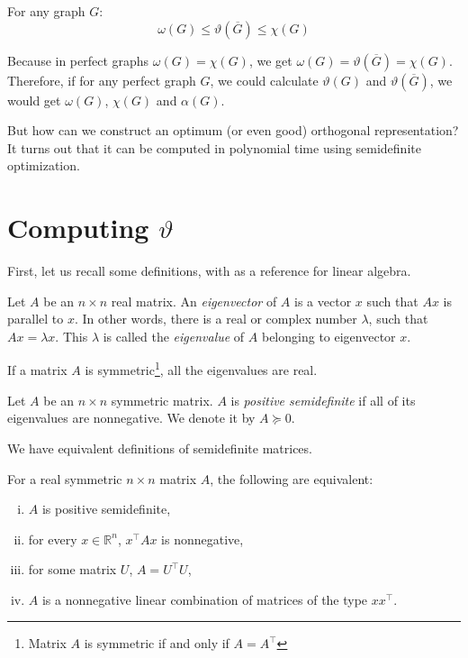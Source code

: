 \begin{theorem}
  \label{thm:sandwich}
  For any graph $G$:
  $$ \omega(G) \leq \vartheta(\overline{G}) \leq \chi(G) $$
\end{theorem}

Because in perfect graphs $\omega(G) = \chi(G)$, we get $\omega(G) = \vartheta(\overline{G}) = \chi(G)$. Therefore, if for any perfect graph $G$, we could calculate $\vartheta(G)$ and $\vartheta(\overline{G})$, we would get $\omega(G)$, $\chi(G)$ and $\alpha(G)$.

But how can we construct an optimum (or even good) orthogonal representation? It turns out that it can be computed in polynomial time using semidefinite optimization.

\section{Computing \boldmath$\vartheta$}
\label{sec:computingTheta}

First, let us recall some definitions, with \cite{gilbertstrang2020} as a reference for linear algebra.

\begin{defn}
  Let $A$ be an $n \times n$ real matrix. An \emph{eigenvector} of $A$ is a vector $x$ such that $Ax$ is parallel to $x$. In other words, there is a real or complex number $\lambda$, such that $Ax = \lambda x$. This $\lambda$ is called the \emph{eigenvalue} of $A$ belonging to eigenvector $x$.
\end{defn}

If a matrix $A$ is symmetric\footnote{Matrix $A$ is symmetric if and only if $A = A^\intercal$}, all the eigenvalues are real.

\begin{defn}
  Let $A$ be an $n \times n$ symmetric matrix. $A$ is \emph{positive semidefinite} if all of its eigenvalues are nonnegative. We denote it by $A \succeq 0$.
\end{defn}

We have equivalent definitions of semidefinite matrices.
\begin{theorem}
  For a real symmetric $n \times n$ matrix $A$, the following are equivalent:
  \begin{enumerate}[(i)]
    \item $A$ is positive semidefinite,
    \item \label{en:ei2} for every $x \in \mathbb{R}^n$, $x^\intercal Ax$ is nonnegative,
    \item for some matrix $U$, $A = U^\intercal U$,
    \item $A$ is a nonnegative linear combination of matrices of the type $xx^\intercal$.
  \end{enumerate}
\end{theorem}


